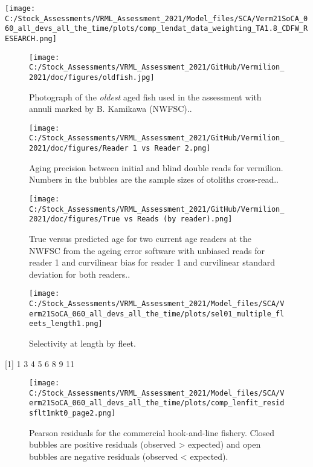 \documentclass[11pt,
  english,
  a4paper,
]{article}
\begin{document}
\texttt{[image: C:/Stock\_Assessments/VRML\_Assessment\_2021/Model\_files/SCA/Verm21SoCA\_060\_all\_devs\_all\_the\_time/plots/comp\_lendat\_data\_weighting\_TA1.8\_CDFW\_RESEARCH.png]}

\begin{figure}
\centering
\texttt{[image: C:/Stock\_Assessments/VRML\_Assessment\_2021/GitHub/Vermilion\_2021/doc/figures/oldfish.jpg]}
\caption{Photograph of the \emph{oldest} aged fish used in the assessment with annuli marked by B. Kamikawa (NWFSC)..\label{fig:oldfish}}
\end{figure}

\begin{figure}
\centering
\texttt{[image: C:/Stock\_Assessments/VRML\_Assessment\_2021/GitHub/Vermilion\_2021/doc/figures/Reader 1 vs Reader 2.png]}
\caption{Aging precision between initial and blind double reads for vermilion. Numbers in the bubbles are the sample sizes of otoliths cross-read..\label{fig:reader1reader2}}
\end{figure}

\begin{figure}
\centering
\texttt{[image: C:/Stock\_Assessments/VRML\_Assessment\_2021/GitHub/Vermilion\_2021/doc/figures/True vs Reads (by reader).png]}
\caption{True versus predicted age for two current age readers at the NWFSC from the ageing error software with unbiased reads for reader 1 and curvilinear bias for reader 1 and curvilinear standard deviation for both readers..\label{fig:truereads}}
\end{figure}

\begin{figure}
\centering
\texttt{[image: C:/Stock\_Assessments/VRML\_Assessment\_2021/Model\_files/SCA/Verm21SoCA\_060\_all\_devs\_all\_the\_time/plots/sel01\_multiple\_fleets\_length1.png]}
\caption{Selectivity at length by fleet.\label{fig:selex}}
\end{figure}

{[}1{]} 1 3 4 5 6 8 9 11

\begin{figure}
\centering
\texttt{[image: C:/Stock\_Assessments/VRML\_Assessment\_2021/Model\_files/SCA/Verm21SoCA\_060\_all\_devs\_all\_the\_time/plots/comp\_lenfit\_residsflt1mkt0\_page2.png]}
\caption{Pearson residuals for the commercial hook-and-line fishery. Closed bubbles are positive residuals (observed \textgreater{} expected) and open bubbles are negative residuals (observed \textless{} expected).\label{fig:len-pearson-COM-HKL}}
\end{figure}
\end{document}
